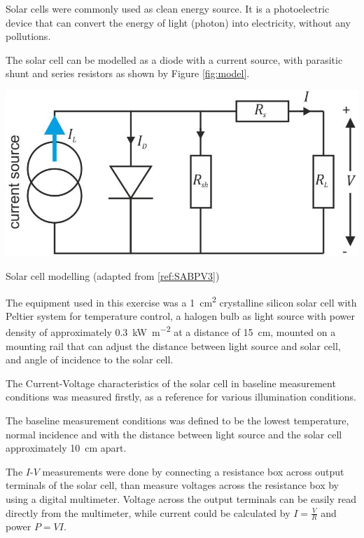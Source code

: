 \begin{Content}

Solar cells were commonly used as clean energy source. It is a photoelectric device that can convert the energy of light (photon) into electricity, without any pollutions.
\Par

The solar cell can be modelled as a diode with a current source, with parasitic shunt and series resistors as shown by Figure \ref{fig:model}.
\begin{Figure}
	\includegraphics[width=0.9\columnwidth]{model}
	\caption{Solar cell modelling (adapted from \ref{ref:SABPV3})}
	\label{fig:model}
\end{Figure}

The equipment used in this exercise was a \SI{1}{\square\centi\metre} crystalline silicon solar cell with Peltier system for temperature control, a halogen bulb as light source with power density of approximately \SI{0.3}{\kilo\watt\per\square\metre} at a distance of \SI{15}{\centi\metre}, mounted on a mounting rail that can adjust the distance between light source and solar cell, and angle of incidence to the solar cell.


The Current-Voltage characteristics of the solar cell in baseline measurement conditions was measured firstly, as a reference for various illumination conditions.
\Par

The baseline measurement conditions was defined to be the lowest temperature, normal incidence and with the distance between light source and the solar cell approximately \SI{10}{\centi\metre} apart.


The $I$-$V$ measurements were done by connecting a resistance box across output terminals of the solar cell, than measure voltages across the resistance box by using a digital multimeter. Voltage across the output terminals can be easily read directly from the multimeter, while current could be calculated by $I = \frac{V}{R}$ and power $P = VI$.
\Par


\end{Content}
